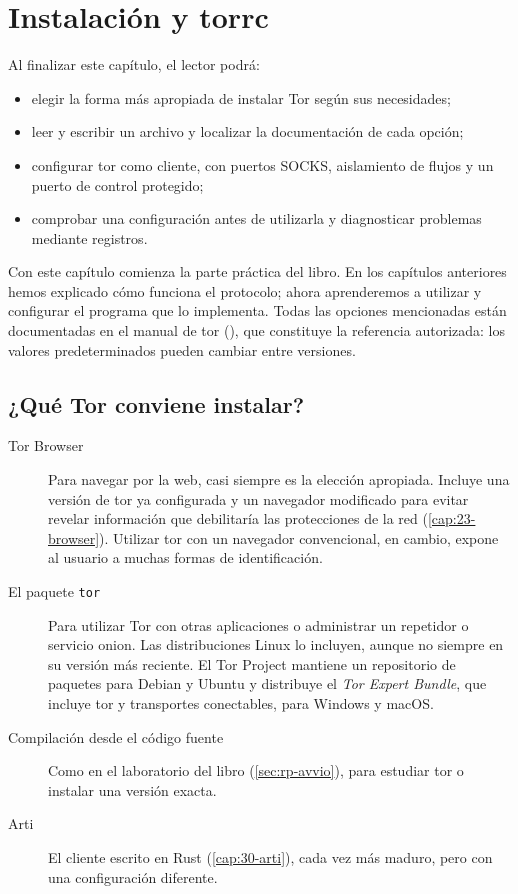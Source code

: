 \chapter{Instalación y torrc}\label{cap:17-torrc}

\begin{obiettivi}
Al finalizar este capítulo, el lector podrá:
\begin{itemize}[nosep]
  \item elegir la forma más apropiada de instalar Tor según sus necesidades;
  \item leer y escribir un archivo  y localizar la documentación de cada opción;
  \item configurar tor como cliente, con puertos SOCKS, aislamiento de flujos y un puerto de control protegido;
  \item comprobar una configuración antes de utilizarla y diagnosticar problemas mediante registros.
\end{itemize}
\end{obiettivi}

Con este capítulo comienza la parte práctica del libro. En los capítulos anteriores hemos explicado cómo funciona el protocolo; ahora aprenderemos a utilizar y configurar el programa que lo implementa. Todas las opciones mencionadas están documentadas en el manual de tor (), que constituye la referencia autorizada: los valores predeterminados pueden cambiar entre versiones.

\section{¿Qué Tor conviene instalar?}\label{sec:torrc-installare}

\begin{description}
  \item[Tor Browser] Para navegar por la web, casi siempre es la elección apropiada. Incluye una versión de tor ya configurada y un navegador modificado para evitar revelar información que debilitaría las protecciones de la red (\cref{cap:23-browser}). Utilizar tor con un navegador convencional, en cambio, expone al usuario a muchas formas de identificación.
  \item[El paquete \texttt{tor}] Para utilizar Tor con otras aplicaciones o administrar un repetidor o servicio onion. Las distribuciones Linux lo incluyen, aunque no siempre en su versión más reciente. El Tor Project mantiene un repositorio de paquetes para Debian y Ubuntu y distribuye el \emph{Tor Expert Bundle}, que incluye tor y transportes conectables, para Windows y macOS.
  \item[Compilación desde el código fuente] Como en el laboratorio del libro (\cref{sec:rp-avvio}), para estudiar tor o instalar una versión exacta.
  \item[Arti] El cliente escrito en Rust (\cref{cap:30-arti}), cada vez más maduro, pero con una configuración diferente.
\end{description}

